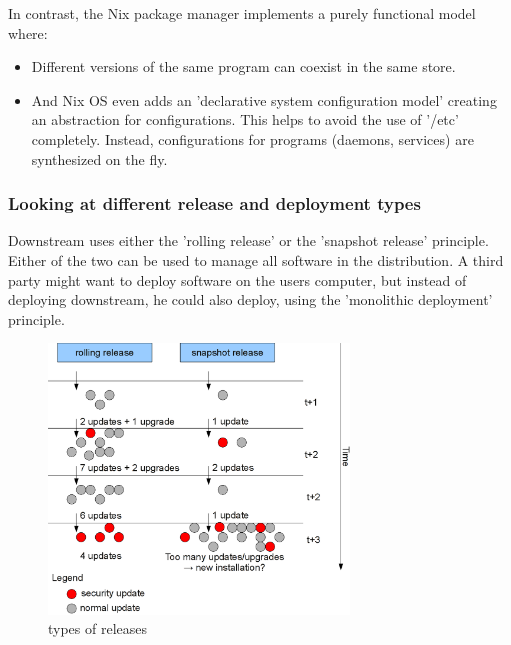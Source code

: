 \documentclass[a4paper,10pt]{article}
\begin{document}
In contrast, the Nix package manager implements a purely functional model where:
\begin{itemize}
\item Different versions of the same program can coexist in the same store.
\item And Nix OS even adds an 'declarative system configuration model' creating an abstraction for configurations. This helps to avoid the use of '/etc' completely. Instead, configurations for programs (daemons, services) are synthesized on the fly.
\end{itemize}



\subsubsection*{Looking at different release and deployment types}
Downstream uses either the 'rolling release' or the 'snapshot release' principle. Either of the two can be used to manage all software in the distribution. A third party might want to deploy software on the users computer, but instead of deploying downstream, he could also deploy, using the 'monolithic deployment' principle.

\begin{figure}[h]
\caption[Kurzeintrag]{types of releases}
  \centering
\includegraphics[width=80mm]{diagrams/release_types.png}
\end{figure}
\end{document}
